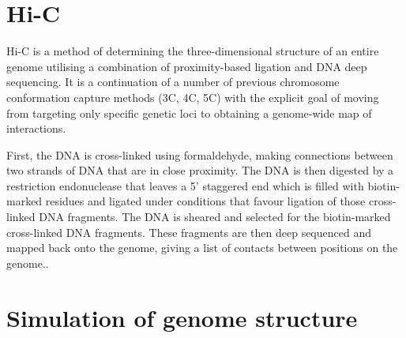 \documentclass[a4paper,11pt,oneside,final,english,toc=bib]{scrbook}
\begin{document}

\section{Hi-C} %
\label{sec:hi_c}

Hi-C is a method of determining the three-dimensional structure of an entire genome utilising a combination of proximity-based ligation and DNA deep sequencing. It is a continuation of a number of previous chromosome conformation capture methods (3C, 4C, 5C) with the explicit goal of moving from targeting only specific genetic loci to obtaining a genome-wide map of interactions.

First, the DNA is cross-linked using formaldehyde, making connections between two strands of DNA that are in close proximity. The DNA is then digested by a restriction endonuclease that leaves a 5' staggered end which is filled with biotin-marked residues and ligated under conditions that favour ligation of those cross-linked DNA fragments. The DNA is sheared and selected for the biotin-marked cross-linked DNA fragments. These fragments are then deep sequenced and mapped back onto the genome, giving a list of contacts between positions on the genome.\cite{lieberman-aiden_comprehensive_2009}.


\section{Simulation of genome structure} %
\label{sec:simulation_of_genome_structure}
\end{document}
